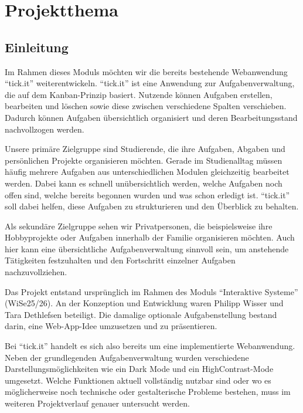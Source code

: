 \chapter{Projektthema}
\label{chap:projektthema}

\section{Einleitung}
\label{sec:pt-einleitung}

Im Rahmen dieses Moduls möchten wir die bereits bestehende Webanwendung \enquote{tick.it} weiterentwickeln.
\enquote{tick.it} ist eine Anwendung zur Aufgabenverwaltung, die auf dem Kanban-Prinzip basiert.
Nutzende können Aufgaben erstellen, bearbeiten und löschen sowie diese zwischen verschiedene Spalten verschieben.
Dadurch können Aufgaben übersichtlich organisiert und deren Bearbeitungsstand nachvollzogen werden.

Unsere primäre Zielgruppe sind Studierende, die ihre Aufgaben, Abgaben und persönlichen Projekte organisieren möchten.
Gerade im Studienalltag müssen häufig mehrere Aufgaben aus unterschiedlichen Modulen gleichzeitig bearbeitet werden.
Dabei kann es schnell unübersichtlich werden, welche Aufgaben noch offen sind, welche bereits begonnen wurden und was schon erledigt ist.
\enquote{tick.it} soll dabei helfen, diese Aufgaben zu strukturieren und den Überblick zu behalten.

Als sekundäre Zielgruppe sehen wir Privatpersonen, die beispielsweise ihre Hobbyprojekte oder Aufgaben innerhalb der Familie organisieren möchten.
Auch hier kann eine übersichtliche Aufgabenverwaltung sinnvoll sein, um anstehende Tätigkeiten festzuhalten und den Fortschritt einzelner Aufgaben nachzuvollziehen.

Das Projekt entstand ursprünglich im Rahmen des Moduls \enquote{Interaktive Systeme} (WiSe25/26).
An der Konzeption und Entwicklung waren Philipp Wisser und Tara Dethlefsen beteiligt.
Die damalige optionale Aufgabenstellung bestand darin, eine Web-App-Idee umzusetzen und zu präsentieren.

Bei \enquote{tick.it} handelt es sich also bereits um eine implementierte Webanwendung.
Neben der grundlegenden Aufgabenverwaltung wurden verschiedene Darstellungsmöglichkeiten wie ein Dark Mode und ein HighContrast-Mode umgesetzt.
Welche Funktionen aktuell vollständig nutzbar sind oder wo es möglicherweise noch technische oder gestalterische Probleme bestehen, muss im weiteren Projektverlauf genauer untersucht werden.

